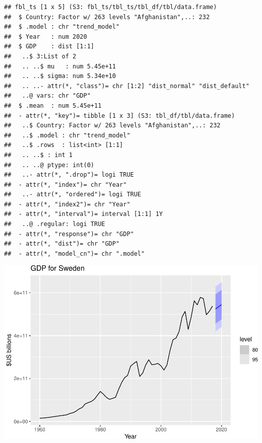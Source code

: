 \documentclass[
]{book}
\newenvironment{Shaded}{\begin{snugshade}}{\end{snugshade}}
\newcommand{\FunctionTok}[1]{\textcolor[rgb]{0.00,0.00,0.00}{#1}}
\newcommand{\NormalTok}[1]{#1}
\newcommand{\SpecialCharTok}[1]{\textcolor[rgb]{0.00,0.00,0.00}{#1}}
\newcommand{\StringTok}[1]{\textcolor[rgb]{0.31,0.60,0.02}{#1}}
\begin{document}
\begin{verbatim}
## fbl_ts [1 x 5] (S3: fbl_ts/tbl_ts/tbl_df/tbl/data.frame)
##  $ Country: Factor w/ 263 levels "Afghanistan",..: 232
##  $ .model : chr "trend_model"
##  $ Year   : num 2020
##  $ GDP    : dist [1:1] 
##   ..$ 3:List of 2
##   .. ..$ mu   : num 5.45e+11
##   .. ..$ sigma: num 5.34e+10
##   .. ..- attr(*, "class")= chr [1:2] "dist_normal" "dist_default"
##   ..@ vars: chr "GDP"
##  $ .mean  : num 5.45e+11
##  - attr(*, "key")= tibble [1 x 3] (S3: tbl_df/tbl/data.frame)
##   ..$ Country: Factor w/ 263 levels "Afghanistan",..: 232
##   ..$ .model : chr "trend_model"
##   ..$ .rows  : list<int> [1:1] 
##   .. ..$ : int 1
##   .. ..@ ptype: int(0) 
##   ..- attr(*, ".drop")= logi TRUE
##  - attr(*, "index")= chr "Year"
##   ..- attr(*, "ordered")= logi TRUE
##  - attr(*, "index2")= chr "Year"
##  - attr(*, "interval")= interval [1:1] 1Y
##   ..@ .regular: logi TRUE
##  - attr(*, "response")= chr "GDP"
##  - attr(*, "dist")= chr "GDP"
##  - attr(*, "model_cn")= chr ".model"
\end{verbatim}

\begin{Shaded}
\end{Shaded}

\includegraphics{graphics/visualize forecasts 2-1.pdf}
\end{document}
